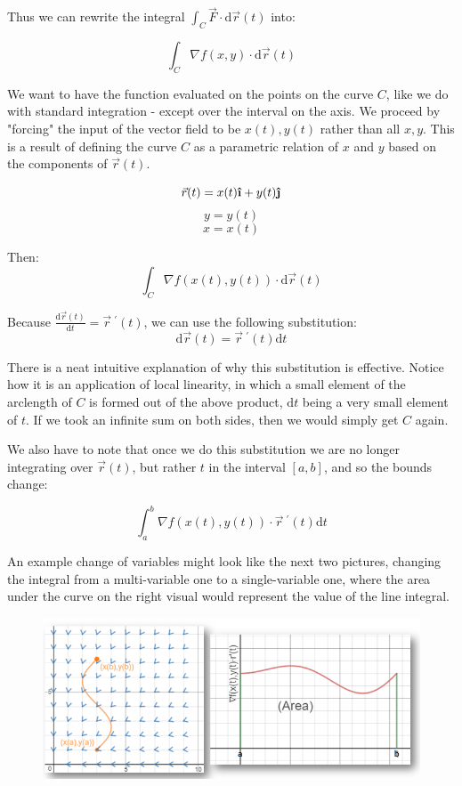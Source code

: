 \documentclass[11pt]{article}
\newcommand{\ihat}{\boldsymbol{\hat{\textbf{\i}}}}
\newcommand{\jhat}{\boldsymbol{\hat{\textbf{\j}}}}
\newcommand{\dr}{\vec{r}~^{\prime}(t)}
\begin{document}
Thus we can rewrite the integral $\displaystyle{\int_C \vec{F}\cdot\mathrm{d}\vec{r}(t)}$ into:

$$\int_C \nabla f(x,y)\cdot \mathrm{d}\vec{r}(t)$$

We want to have the function evaluated on the points on the curve $C$, like we do with standard integration - except over the interval on the axis. We proceed by "forcing" the input of the vector field to be $x(t),y(t)$ rather than all $x,y$. This is a result of defining the curve $C$ as a parametric relation of $x$ and $y$ based on the components of $\vec{r}(t)$.

$$\vec{r}(t)=x(t)\ihat+y(t)\jhat$$
$$y=y(t)$$
$$x=x(t)$$


Then:
$$\int_C \nabla f(x(t),y(t))\cdot \mathrm{d}\vec{r}(t)$$

Because $\displaystyle{\frac{\mathrm{d}\vec{r}(t)}{\mathrm{d}t}=\dr}$, we can use the following substitution:
$$\mathrm{d}\vec{r}(t)=\dr\mathrm{d}t$$

There is a neat intuitive explanation of why this substitution is effective. Notice how it is an application of local linearity, in which a small element of the arclength of $C$ is formed out of the above product, $\mathrm{d}t$ being a very small element of $t$. If we took an infinite sum on both sides, then we would simply get $C$ again.

We also have to note that once we do this substitution we are no longer integrating over $\vec{r}(t)$, but rather $t$ in the interval $[a,b]$, and so the bounds change:

$$\int_a^b \nabla f(x(t),y(t))\cdot \dr\mathrm{d}t$$

An example change of variables might look like the next two pictures, changing the integral from a multi-variable one to a single-variable one, where the area under the curve on the right visual would represent the value of the line integral.

\begin{figure}[h]
\centering
\includegraphics[scale=0.75]{cvars}
\end{figure}
\end{document}
